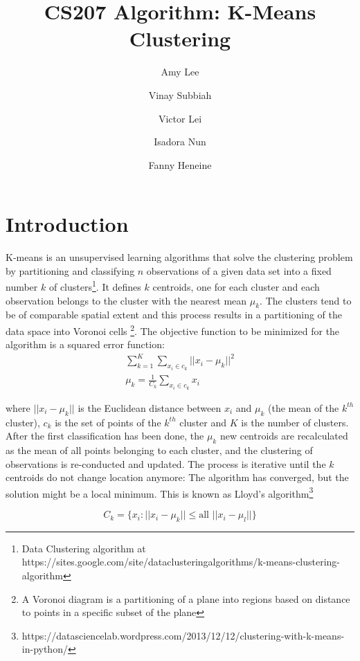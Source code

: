 \documentclass[11pt]{article}
\title{CS207 Algorithm: K-Means Clustering}
\author{Amy Lee \and Vinay Subbiah \and Victor Lei \and Isadora Nun \and Fanny Heneine}
\begin{document}
\maketitle{}

\pagestyle{plain}

\section*{Introduction}
K-means is an unsupervised learning algorithms that solve the clustering problem by partitioning and classifying $n$ observations of a given data set into a fixed number $k$ of clusters\footnote{Data Clustering algorithm at https://sites.google.com/site/dataclusteringalgorithms/k-means-clustering-algorithm}.
It defines $k$ centroids, one for each cluster and each observation belongs to the cluster with the nearest mean $\mu_k$. The clusters tend to be of comparable spatial extent and this process results in a partitioning of the data space into Voronoi cells \footnote{A Voronoi diagram is a partitioning of a plane into regions based on distance to points in a specific subset of the plane}. The objective function to be minimized for the algorithm is a squared error function:
\begin{gather}
\sum_{k=1}^{K}\sum_{x_i \in c_k}\Big|\Big|x_i-\mu_k\Big|\Big|^2 \\
\mu_k=\frac{1}{C_k}\sum_{x_i \in c_k} x_i
\end{gather}

\noindent where $\big|\big|x_i-\mu_k\big|\big|$ is the Euclidean distance between $x_i$ and $\mu_k$ (the mean of the $k^{th}$ cluster), $c_k$ is the set of points of the $k^{th}$ cluster and $K$ is the number of clusters. \\


\noindent After the first classification has been done, the $\mu_k$ new centroids are recalculated as the mean of all points belonging to each cluster, and the clustering of observations is re-conducted and updated. The process is iterative until the $k$ centroids do not change location anymore: The algorithm has converged, but the solution might be a local minimum. This is known as Lloyd’s algorithm\footnote{https://datasciencelab.wordpress.com/2013/12/12/clustering-with-k-means-in-python/}


\begin{equation}
C_k=\{x_i: \big|\big|x_i-\mu_k\big|\big| \leq \text{all } \big|\big|x_i-\mu_l\big|\big|\}
\end{equation}
\end{document}
